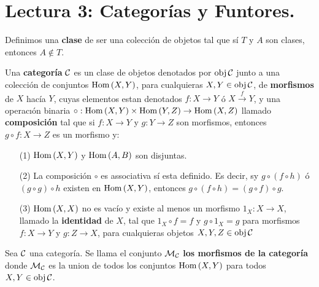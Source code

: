 \section*{Lectura 3: Categor\'ias y Funtores.}

\begin{definition}
    Definimos una \textbf{clase} de ser una colecci\'on de objetos tal que s\'i
    $T$ y  $A$ son clases, entonces  $A \notin T$.
\end{definition}

\begin{definition}
    Una \textbf{categor\'ia} $\mathcal{C}$ es un clase de objetos denotados por
    $\operatorname{obj}{\mathcal{C}}$ junto a una colecci\'on de conjuntos $\operatorname{Hom}{(X,Y)}$,  para
    cualquieras $X,Y \in \operatorname{obj}{\mathcal{C}}$, de \textbf{morfismos} de $X$ hac\'ia $Y$,
    cuyas elementos estan denotados $f:X \rightarrow Y$ \'o $X \xrightarrow{f}
    Y$, y una operac\i\'on binaria $\circ:\operatorname{Hom}{(X,Y)} \times \operatorname{Hom}{(Y,Z)}
    \rightarrow \operatorname{Hom}{(X,Z)}$ llamado \textbf{composici\'on} tal que si $f:X
    \rightarrow Y$ y $g:Y \rightarrow Z$ son morfismos, entonces $g \circ f:X
    \rightarrow Z$ es un morfismo y:
    \begin{enumerate}
        \item[(1)] $\operatorname{Hom}{(X,Y)}$ y $\operatorname{Hom}{(A,B)}$ son disjuntas.

        \item[(2)] La composici\'on $\circ$ es associativa s\'i esta definido.
            Es decir, sy  $g \circ (f \circ h)$ \'o $(g \circ g) \circ h$
            existen en $\operatorname{Hom}{(X,Y)}$, entonces $g \circ (f \circ h)=(g \circ f)
            \circ g$.

        \item[(3)] $\operatorname{Hom}{(X,X)}$ no es vac\'io y existe al menos un morfismo
            $1_X:X \rightarrow X$, llamado la \textbf{identidad} de $X$, tal que
            $1_X \circ f=f$ y  $g \circ 1_X=g$ para morfismos  $f:X \rightarrow
            Y$ y $g:Z \rightarrow X$, para cualquieras objetos $X,Y,Z \in
            \operatorname{obj}{\mathcal{C}}$
    \end{enumerate}
\end{definition}

\begin{definition}
    Sea $\mathcal{C}$ una categor\'ia. Se llama el conjunto $\mathcal{M}_{\mathcal{C}}$  \textbf{los
    morfismos de la categor\'ia} donde $\mathcal{M}_{\mathcal{C}}$ es la union de todos los
    conjuntos $\operatorname{Hom}{(X,Y)}$ para todos $X,Y \in \operatorname{obj}{\mathcal{C}}$.
\end{definition}

